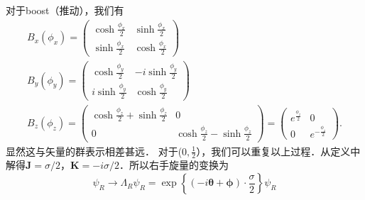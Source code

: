 对于boost（推动），我们有
\begin{equation}
\begin{array}{c}
B_{x}\left(\phi_{x}\right)=\left(\begin{array}{cc}
\cosh \frac{\phi_{x}}{2} & \sinh \frac{\phi_{x}}{2} \\
\sinh \frac{\phi_{x}}{2} & \cosh \frac{\phi_{x}}{2}
\end{array}\right) \\
B_{y}\left(\phi_{y}\right)=\left(\begin{array}{cc}
\cosh \frac{\phi_{y}}{2} & -i \sinh \frac{\phi_{y}}{2} \\
i \sinh \frac{\phi_{y}}{2} & \cosh \frac{\phi_{y}}{2}
\end{array}\right) \\
B_{z}\left(\phi_{z}\right)=\left(\begin{array}{cc}
\cosh \frac{\phi_{z}}{2}+\sinh \frac{\phi_{z}}{2} & 0 \\
0 & \cosh \frac{\phi_{z}}{2}-\sinh \frac{\phi_{z}}{2}
\end{array}\right)=\left(\begin{array}{cc}
e^{\frac{\phi_{z}}{2}} & 0 \\
0 & e^{-\frac{\phi_{z}}{2}}
\end{array}\right) .
\end{array}
\end{equation}
显然这与矢量的群表示相差甚远．
对于($0,\frac{1}{2}$），我们可以重复以上过程．从定义中解得$\mathbf{J}=\sigma / 2 ，\mathbf{K}=-i \sigma / 2$．所以右手旋量的变换为
\begin{equation}
\psi_{R} \rightarrow \Lambda_{R} \psi_{R}=\exp \left\{(-i \boldsymbol{\theta}+\boldsymbol{\phi}) \cdot \frac{\sigma}{2}\right\} \psi_{R}
\end{equation}

